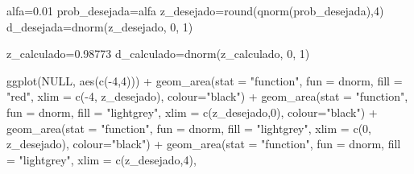 \documentclass[
]{book}
\newenvironment{Shaded}{\begin{snugshade}}{\end{snugshade}}
\newcommand{\AttributeTok}[1]{\textcolor[rgb]{0.77,0.63,0.00}{#1}}
\newcommand{\ConstantTok}[1]{\textcolor[rgb]{0.00,0.00,0.00}{#1}}
\newcommand{\DecValTok}[1]{\textcolor[rgb]{0.00,0.00,0.81}{#1}}
\newcommand{\FloatTok}[1]{\textcolor[rgb]{0.00,0.00,0.81}{#1}}
\newcommand{\FunctionTok}[1]{\textcolor[rgb]{0.00,0.00,0.00}{#1}}
\newcommand{\NormalTok}[1]{#1}
\newcommand{\OtherTok}[1]{\textcolor[rgb]{0.56,0.35,0.01}{#1}}
\newcommand{\SpecialCharTok}[1]{\textcolor[rgb]{0.00,0.00,0.00}{#1}}
\newcommand{\StringTok}[1]{\textcolor[rgb]{0.31,0.60,0.02}{#1}}
\begin{document}
\begin{Shaded}
\begin{Highlighting}[]
\NormalTok{alfa}\OtherTok{=}\FloatTok{0.01}
\NormalTok{prob\_desejada}\OtherTok{=}\NormalTok{alfa}
\NormalTok{z\_desejado}\OtherTok{=}\FunctionTok{round}\NormalTok{(}\FunctionTok{qnorm}\NormalTok{(prob\_desejada),}\DecValTok{4}\NormalTok{)}
\NormalTok{d\_desejada}\OtherTok{=}\FunctionTok{dnorm}\NormalTok{(z\_desejado, }\DecValTok{0}\NormalTok{, }\DecValTok{1}\NormalTok{)}

\NormalTok{z\_calculado}\OtherTok{=}\FloatTok{0.98773}
\NormalTok{d\_calculado}\OtherTok{=}\FunctionTok{dnorm}\NormalTok{(z\_calculado, }\DecValTok{0}\NormalTok{, }\DecValTok{1}\NormalTok{)}




\FunctionTok{ggplot}\NormalTok{(}\ConstantTok{NULL}\NormalTok{, }\FunctionTok{aes}\NormalTok{(}\FunctionTok{c}\NormalTok{(}\SpecialCharTok{{-}}\DecValTok{4}\NormalTok{,}\DecValTok{4}\NormalTok{))) }\SpecialCharTok{+}
  \FunctionTok{geom\_area}\NormalTok{(}\AttributeTok{stat =} \StringTok{"function"}\NormalTok{, }
            \AttributeTok{fun =}\NormalTok{ dnorm, }
            \AttributeTok{fill =} \StringTok{"red"}\NormalTok{, }
            \AttributeTok{xlim =} \FunctionTok{c}\NormalTok{(}\SpecialCharTok{{-}}\DecValTok{4}\NormalTok{, z\_desejado),}
            \AttributeTok{colour=}\StringTok{"black"}\NormalTok{) }\SpecialCharTok{+}
  \FunctionTok{geom\_area}\NormalTok{(}\AttributeTok{stat =} \StringTok{"function"}\NormalTok{, }
            \AttributeTok{fun =}\NormalTok{ dnorm, }
            \AttributeTok{fill =} \StringTok{"lightgrey"}\NormalTok{, }
            \AttributeTok{xlim =} \FunctionTok{c}\NormalTok{(z\_desejado,}\DecValTok{0}\NormalTok{),}
            \AttributeTok{colour=}\StringTok{"black"}\NormalTok{) }\SpecialCharTok{+}
  \FunctionTok{geom\_area}\NormalTok{(}\AttributeTok{stat =} \StringTok{"function"}\NormalTok{, }
            \AttributeTok{fun =}\NormalTok{ dnorm, }
            \AttributeTok{fill =} \StringTok{"lightgrey"}\NormalTok{, }
            \AttributeTok{xlim =} \FunctionTok{c}\NormalTok{(}\DecValTok{0}\NormalTok{, z\_desejado),}
            \AttributeTok{colour=}\StringTok{"black"}\NormalTok{) }\SpecialCharTok{+}
  \FunctionTok{geom\_area}\NormalTok{(}\AttributeTok{stat =} \StringTok{"function"}\NormalTok{, }
            \AttributeTok{fun =}\NormalTok{ dnorm, }
            \AttributeTok{fill =} \StringTok{"lightgrey"}\NormalTok{, }
            \AttributeTok{xlim =} \FunctionTok{c}\NormalTok{(z\_desejado,}\DecValTok{4}\NormalTok{),}

\end{Highlighting}
\end{Shaded}
\end{document}
